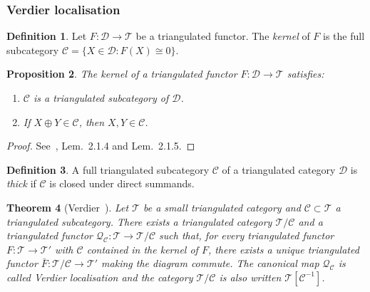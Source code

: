 \documentclass[12pt,a4paper]{article}
\newtheorem{theorem}{Theorem}[section]
\newtheorem{proposition}[theorem]{Proposition}
\theoremstyle{definition}
\newtheorem{definition}[theorem]{Definition}
\begin{document}
\subsubsection{Verdier localisation}

\begin{definition}\label{def:kernel}
Let $F:\mathcal{D}\to\mathcal{T}$ be a triangulated functor.  The \emph{kernel} of
$F$ is the full subcategory $\mathcal{C}=\{X\in\mathcal{D}: F(X)\cong 0\}$.
\end{definition}

\begin{proposition}\label{prop:kernel-properties}
The kernel of a triangulated functor $F:\mathcal{D}\to\mathcal{T}$ satisfies:
\begin{enumerate}
  \item $\mathcal{C}$ is a triangulated subcategory of $\mathcal{D}$.
  \item If $X\oplus Y\in\mathcal{C}$, then $X,Y\in\mathcal{C}$.
\end{enumerate}
\end{proposition}
\begin{proof}
See~\cite{Nee01}, Lem.\ 2.1.4 and Lem.\ 2.1.5.
\end{proof}

\begin{definition}\label{def:thick}
A full triangulated subcategory $\mathcal{C}$ of a triangulated category $\mathcal{D}$
is \emph{thick} if $\mathcal{C}$ is closed under direct summands.
\end{definition}

\begin{theorem}[Verdier~\cite{Ver77}]\label{thm:Verdier-localisation}
Let $\mathcal{T}$ be a small triangulated category and $\mathcal{C}\subset\mathcal{T}$
a triangulated subcategory.  There exists a triangulated category $\mathcal{T}/\mathcal{C}$
and a triangulated functor $\mathcal{Q}_\mathcal{C}:\mathcal{T}\to\mathcal{T}/\mathcal{C}$
such that, for every triangulated functor $F:\mathcal{T}\to\mathcal{T}'$ with
$\mathcal{C}$ contained in the kernel of $F$, there exists a unique triangulated
functor $\bar{F}:\mathcal{T}/\mathcal{C}\to\mathcal{T}'$ making the diagram commute.
The canonical map $\mathcal{Q}_\mathcal{C}$ is called \emph{Verdier localisation} and
the category $\mathcal{T}/\mathcal{C}$ is also written $\mathcal{T}[\mathcal{C}^{-1}]$.
\end{theorem}
\end{document}
